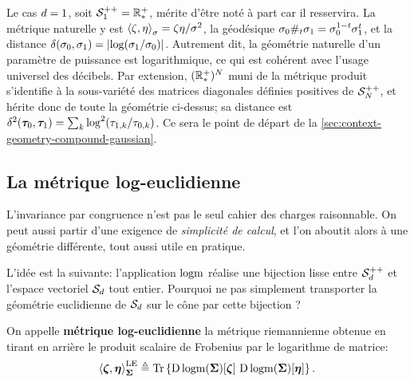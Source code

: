 \begin{remark}
\label{rem:context-riemann-rplus}
  Le cas $d=1$, soit $\mathcal{S}_{1}^{++}=\mathbb{R}_*^+$, mérite d'être noté à part car il resservira. La métrique naturelle y est $\left\langle \zeta, \eta \right\rangle_{\sigma}=\zeta\eta/\sigma^2$, la géodésique $\sigma_0\#_t\sigma_1=\sigma_0^{1-t}\sigma_1^{t}$, et la distance $\delta(\sigma_0,\sigma_1)=\left\lvert\log(\sigma_1/\sigma_0)\right\rvert$. Autrement dit, la géométrie naturelle d'un paramètre de puissance est logarithmique, ce qui est cohérent avec l'usage universel des décibels. Par extension, $(\mathbb{R}_*^+)^{N}$ muni de la métrique produit s'identifie à la sous-variété des matrices diagonales définies positives de $\mathcal{S}_{N}^{++}$, et hérite donc de toute la géométrie ci-dessus; sa distance est $\delta^2(\boldsymbol{\tau}_0,\boldsymbol{\tau}_1)=\sum_k\log^2(\tau_{1,k}/\tau_{0,k})$. Ce sera le point de départ de la \cref{sec:context-geometry-compound-gaussian}.
\end{remark}

\subsection{La métrique log-euclidienne}

L'invariance par congruence n'est pas le seul cahier des charges raisonnable. On peut aussi partir d'une exigence de \emph{simplicité de calcul}, et l'on aboutit alors à une géométrie différente, tout aussi utile en pratique.

L'idée est la suivante: l'application $\operatorname{\operatorname{logm}}$ réalise une bijection lisse entre $\mathcal{S}_{d}^{++}$ et l'espace vectoriel $\mathcal{S}_{d}$ tout entier. Pourquoi ne pas simplement transporter la géométrie euclidienne de $\mathcal{S}_{d}$ sur le cône par cette bijection ?

\begin{definition}
\label{def:context-riemann-logeuclidienne}
  On appelle \textbf{métrique log-euclidienne}  la métrique riemannienne obtenue en tirant en arrière le produit scalaire de Frobenius par le logarithme de matrice:
  \begin{equation}
    \left\langle \boldsymbol{\zeta}, \boldsymbol{\eta} \right\rangle_{\boldsymbol{\Sigma}}^{\mathrm{LE}}
    \triangleq
    \operatorname{\operatorname{Tr}}\left\{
      \operatorname{\mathrm{D}}\operatorname{\operatorname{logm}}(\boldsymbol{\Sigma})[\boldsymbol{\zeta}]\,
      \operatorname{\mathrm{D}}\operatorname{\operatorname{logm}}(\boldsymbol{\Sigma})[\boldsymbol{\eta}]
    \right\}.
    \label{eq:context-riemann-metriqueLE}
  \end{equation}
\end{definition}

